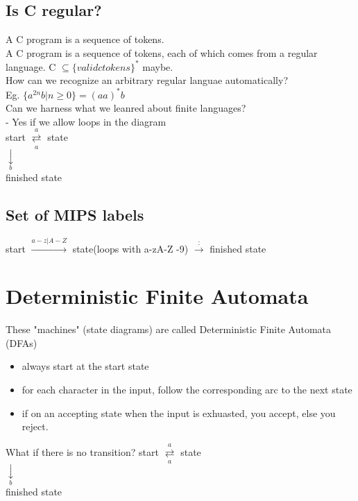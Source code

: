 \documentclass[12pt]{article}
\begin{document}
	\subsection*{Is C regular?}
	A C program is a sequence of tokens.\\
	
	A C program is a sequence of tokens, each of which comes from a regular language. C $\subseteq \{valid ctokens\}^*$ maybe.\\
	
	How can we recognize an arbitrary regular languae automatically?\\
	
	Eg. $\{a^{2n}b | n \geq 0 \} = (aa)^*b$\\
	Can we harness what we leanred about finite languages?\\
	- Yes if we allow loops in the diagram\\
	
	start $\overset{a}{\underset{a}{\rightleftarrows}}$ state\\
	$\underset{b}{\downarrow}$\\
	finished state\\
	
	\subsection*{Set of MIPS labels}
	start $\overset{a-z|A-Z}{\rightarrow}$ state(loops with a-z\textbar A-Z -9) $\overset{:}{\rightarrow}$ finished state\\
	
	\section*{Deterministic Finite Automata}
	These "machines" (state diagrams) are called Deterministic Finite Automata (DFAs)\\
	\begin{itemize}
		\item always start at the start state
		\item for each character in the input, follow the corresponding arc to the next state
		\item if on an accepting state when the input is exhuasted, you accept, else you reject.
	\end{itemize}
	
	What if there is no transition?
	start $\overset{a}{\underset{a}{\rightleftarrows}}$ state\\
	$\underset{b}{\downarrow}$\\
	finished state\\
	
\end{document}

